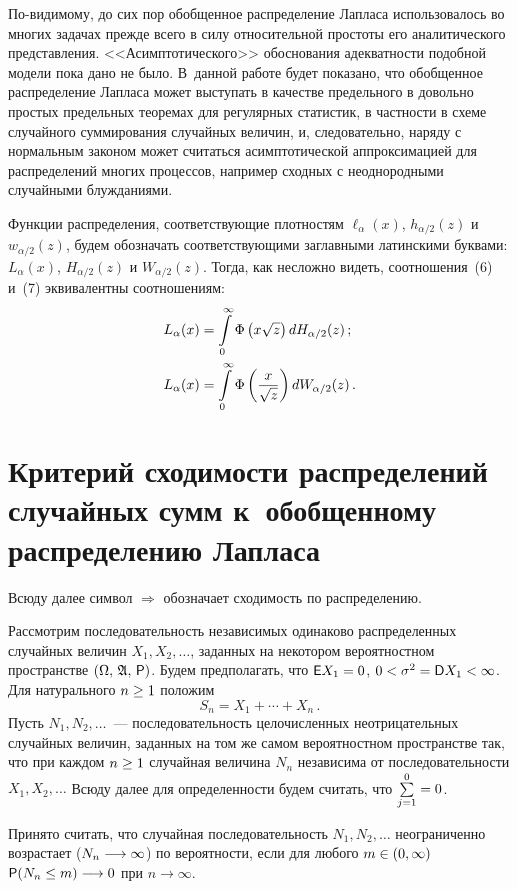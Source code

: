 \begin{multicols}{2}
По-видимому, до сих пор обобщенное распределение Лапласа
использовалось во многих задачах прежде всего в силу относительной
прос\-то\-ты его аналитического представления. <<Асимптотического>>
обоснования адекватности подобной модели пока дано не было. В~данной
работе будет показано, что обобщенное распределение Лапласа может
выступать в качестве предельного в довольно простых предельных
теоремах для регулярных статистик, в частности в схеме случайного
суммирования случайных величин, и, следовательно, наряду с
нормальным законом  может считаться асимптотической аппроксимацией
для распределений многих процессов, например сходных с неоднородными
случайными блужданиями.

Функции распределения, соответствующие плотностям
$\ell_{\alpha}(x)$, $h_{\alpha/2}(z)$ и $w_{\alpha/2}(z)$, будем
обозначать соответствующими заглавными латинскими буквами:
$L_{\alpha}(x)$, $H_{\alpha/2}(z)$ и $W_{\alpha/2}(z)$. Тогда, как
несложно видеть, соотношения~(6) и~(7) эквивалентны соотношениям:
\begin{align}
L_{\alpha}(x)&=\int\limits_0^{\infty}\Phi\left(x\sqrt{z}\right)dH_{\alpha/2}(z)\,;\label{e8-kor}\\
L_{\alpha}(x)&=\int\limits_0^{\infty}\Phi\left(\displaystyle\frac{\displaystyle x\mathstrut}{\displaystyle \sqrt{z}\mathstrut}\right)dW_{\alpha/2}(z)\,.\label{e9-kor}
\end{align}

\section{Критерий сходимости распределений случайных сумм к~обобщенному распределению Лапласа}

Всюду далее символ $\Longrightarrow$ обозначает сходимость по
распределению.

Рассмотрим последовательность независимых одинаково распределенных
случайных величин $X_1,X_2,\ldots$, заданных на некотором
вероятностном пространстве $(\Omega,\, \mathfrak{A},\,{\sf P})$.
Будем предполагать, что ${\sf E}X_1\hm=0$, $0\hm<\sigma^2\hm={\sf D}X_1\hm<\infty$. 
Для натурального $n\hm\ge1$ положим
$$
S_n=X_1+\cdots+X_n\,.
$$
Пусть $N_1,N_2,\ldots$~--- последовательность целочисленных
неотрицательных случайных величин, заданных на том же самом
вероятностном пространстве так, что при каждом $n\hm\ge1$ случайная
величина $N_n$ независима от последовательности $X_1,X_2,\ldots$
Всюду далее для определенности будем считать, что $\sum\limits_{j=1}^0\hm=0$.

Принято считать, что случайная последовательность $N_1,N_2,\ldots$
неограниченно возрастает ($N_n\hm\longrightarrow\infty$) по
вероятности, если для любого $m\hm\in(0,\infty)$ ${\sf P}(N_n\hm\le
m)\hm\longrightarrow 0$ при $n\to\infty$.


\end{multicols}
